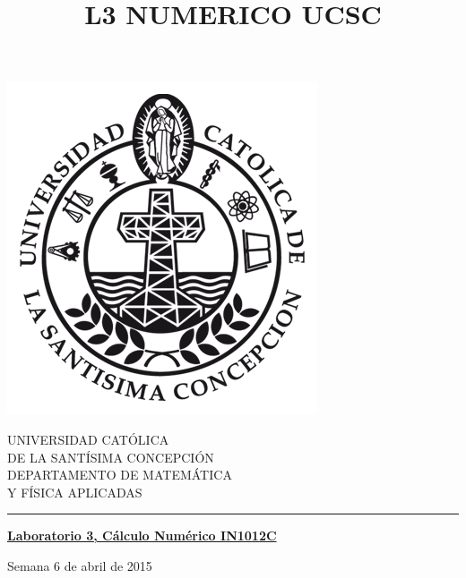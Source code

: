 \documentclass[11pt]{article}
\begin{document}
\title{L3 NUMERICO UCSC}

\begin{minipage}{0.15\textwidth}
\includegraphics[width=\textwidth]{ucsc.png}
\end{minipage}
\begin{minipage}{0.9\textwidth}
{UNIVERSIDAD CAT\'OLICA}\\ 
{DE LA SANT\'ISIMA CONCEPCI\'ON}\\
{DEPARTAMENTO DE MATEM\'ATICA}\\ 
{ Y F\'ISICA APLICADAS}\\
\rule{0.66\textwidth}{.5pt} %
\end{minipage}

\vspace*{0.5cm} \centerline {\bf\underline{Laboratorio 3, C\'alculo Num\'erico  IN1012C }}
\centerline{\textrm{Semana 6 de abril de 2015}}  \vspace{0.2cm}


\end{document}
